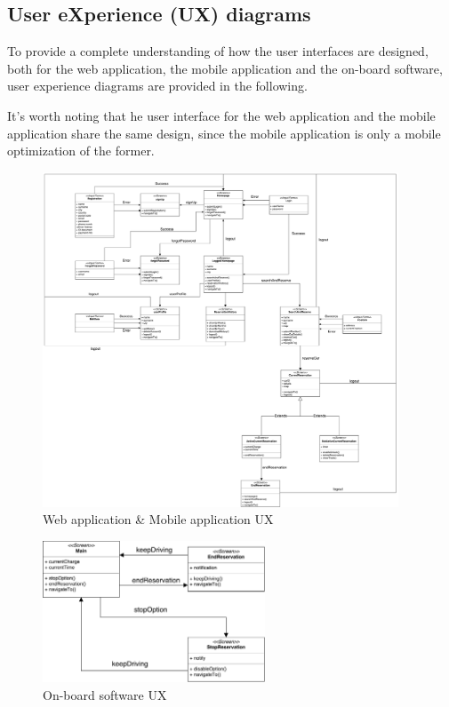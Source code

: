 \subsection{User eXperience (UX) diagrams}

To provide a complete understanding of how the user interfaces are designed, both for the web application, the mobile application and the on-board software, user experience diagrams are provided in the following.

It's worth noting that he user interface for the web application and the mobile application share the same design, since the mobile application is only a mobile optimization of the former.

\begin{figure}[h!]
	\centerline{
		\includegraphics[width=400px]{../Datas/images/deviceUX.pdf}
	}
	\caption{Web application \& Mobile application UX}
	\label{fig: device-ux}
\end{figure}

\begin{figure}[h!]
	\centerline{
		\includegraphics[width=250px]{../Datas/images/carDisplayUX.pdf}
	}
	\caption{On-board software UX}
	\label{fig: car-ux}
\end{figure}
